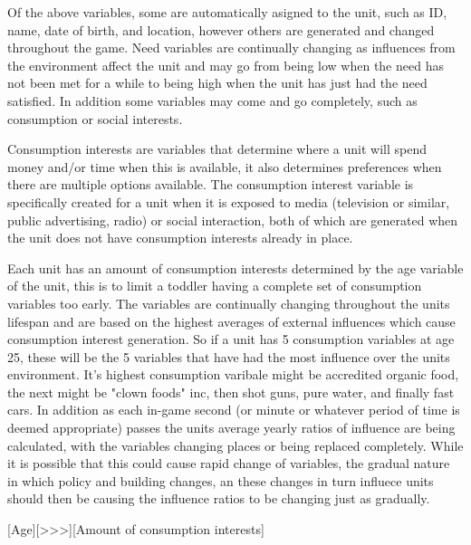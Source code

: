 	

Of the above variables, some are automatically asigned to the unit, such as ID, name, date of birth, and location, however others are generated and changed throughout the game. Need variables are continually changing as influences from the environment affect the unit and may go from being low when the need has not been met for a while to being high when the unit has just had the need satisfied. In addition some variables may come and go completely, such as consumption or social interests. 

Consumption interests are variables that determine where a unit will spend money and/or time when this is available, it also determines preferences when there are multiple options available. The consumption interest variable is specifically created for a unit when it is exposed to media (television or similar, public advertising, radio) or social interaction, both of which are generated when the unit does not have consumption interests already in place. 

Each unit has an amount of consumption interests determined by the age variable of the unit, this is to limit a toddler having a complete set of consumption variables too early. The variables are continually changing throughout the units lifespan and are based on the highest averages of external influences which cause consumption interest generation. So if a unit has 5 consumption variables at age 25, these will be the 5 variables that have had the most influence over the units environment. It's highest consumption varibale might be accredited organic food, the next might be "clown foods" inc, then shot guns, pure water, and finally fast cars. In addition as each in-game second (or minute or whatever period of time is deemed appropriate) passes the units average yearly ratios of influence are being calculated, with the variables changing places or being replaced completely. While it is possible that this could cause rapid change of variables, the gradual nature in which policy and building changes, an these changes in turn influece units should then be causing the influence ratios to be changing just as gradually.   


[Age][>>>][Amount of consumption interests] 







